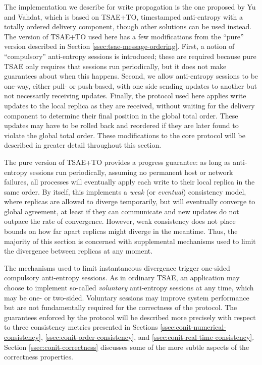 \documentclass[]             %
{NASA}                       %
\theoremstyle{definition}
\begin{document}
The implementation we describe for write propagation is the one
proposed by Yu and Vahdat, which is based on TSAE+TO, timestamped
anti-entropy with a totally ordered delivery component, though other
solutions can be used instead. The version of TSAE+TO used here has a
few modifications from the ``pure'' version described in Section
\ref{ssec:tsae-message-ordering}. First, a notion of ``compulsory''
anti-entropy sessions is introduced; these are required because pure
TSAE only requires that sessions run periodically, but it does not make
guarantees about when this happens. Second, we allow anti-entropy
sessions to be one-way, either pull- or push-based, with one side
sending updates to another but not necessarily receiving
updates. Finally, the protocol used here applies write updates to the
local replica as they are received, without waiting for the delivery
component to determine their final position in the global total
order. These updates may have to be rolled back and reordered if they
are later found to violate the global total order. These modifications
to the core protocol will be described in greater detail throughout
this section.


The pure version of TSAE+TO provides a progress guarantee: as long as
anti-entropy sessions run periodically, assuming no permanent host or
network failures, all processes will eventually apply each write to
their local replica in the same order. By itself, this implements a
\emph{weak} (or \emph{eventual}) consistency model, where replicas are
allowed to diverge temporarily, but will eventually converge to global
agreement, at least if they can communicate and new updates do not
outpace the rate of convergence. However, weak consistency does not
place bounds on how far apart replicas might diverge in the
meantime. Thus, the majority of this section is concerned with
supplemental mechanisms used to limit the divergence between replicas
at any moment.

The mechanisms used to limit instantaneous divergence trigger
one-sided compulsory anti-entropy sessions. As in ordinary TSAE, an
application may choose to implement so-called \emph{voluntary}
anti-entropy sessions at any time, which may be one- or
two-sided. Voluntary sessions may improve system performance but are
not fundamentally required for the correctness of the protocol. The
guarantees enforced by the protocol will be described more precisely
with respect to three consistency metrics presented in Sections
\ref{ssec:conit-numerical-consistency},
\ref{ssec:conit-order-consistency}, and
\ref{ssec:conit-real-time-consistency}. Section
\ref{ssec:conit-correctness} discusses some of the more subtle aspects
of the correctness properties.
\end{document}
